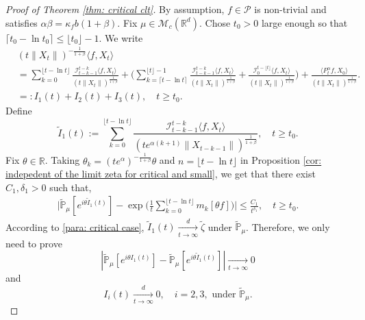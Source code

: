 \documentclass[12pt,a4paper]{amsart}
\theoremstyle{plain}
\theoremstyle{definition}
\numberwithin{equation}{section}
\begin{document}
\begin{proof}[Proof of Theorem \ref{thm: critical clt}]
   By assumption, $f\in\mathcal{P}$ is non-trivial and satisfies $\alpha\beta=\kappa_fb(1+\beta)$.
   Fix $\mu \in \mathcal M_c(\mathbb R^d)$.
    Chose $t_0 > 0$ large enough so that $\lceil t_0-\ln t_0\rceil \leq \lfloor t_0 \rfloor - 1.$
    We write
\begin{align}
    &(t\|X_t\|)^{-\frac{1}{1+\beta}}\langle f,X_t\rangle
    \\ &=\sum_{k=0}^{\lfloor t-\ln t \rfloor} \frac{\mathcal I_{t-k-1}^{t-k}\langle f ,X_t\rangle}{(t\|X_t\|)^{\frac{1}{1+\beta}}}+\Big(\sum_{k=\lceil t-\ln t \rceil}^{\lfloor t \rfloor-1} \frac{\mathcal I_{t-k-1}^{t-k}\langle f ,X_t\rangle}{(t\|X_t\|)^{\frac{1}{1+\beta}}}+\frac{\mathcal I_0^{t-\lfloor t \rfloor}\langle f ,X_t\rangle}{(t\|X_t\|)^{\frac{1}{1+\beta}}}\Big) +
    \frac{\langle P^\alpha_tf,X_0\rangle}{(t\|X_t\|)^{\frac{1}{1+\beta}}}.
    \\&=:I_1(t)+I_2(t) + I_3(t),
    \quad t\geq t_0.
\end{align}
    Define
\[
    \tilde I_1(t)
    :=\sum_{k=0}^{\lfloor t-\ln t \rfloor}\frac{\mathcal I_{t-k-1}^{t-k}\langle f ,X_t\rangle}{(t e^{\alpha(k+1)}\|X_{t-k-1}\|)^{\frac{1}{1+\beta}}},
    \quad t\geq t_0.
\]
Fix $\theta\in \mathbb R$. 
    Taking $\theta_k=(t e^{\alpha})^{-\frac{1}{1+\beta}} \theta $ and $n={\lfloor t-\ln t \rfloor}$ in Proposition \ref{cor: indepedent of the limit zeta for critical and small},
    we get that there exist $C_1,\delta_1>0$ such that,
\begin{align}
    \Big|\mathbb{\tilde{P}}_{\mu} [e^{i\theta\tilde{I}_1(t)}]-\exp\Big(\frac{1}{t}\sum_{k=0}^{\lfloor t-\ln t \rfloor}m_k[\theta f]\Big)\Big|\leq \frac{C_1}{t^{\delta_1}},
    \quad t\geq t_0.
\end{align}
    According to \eqref{para: critical case},  $\tilde{I}_1(t)\xrightarrow[t\to \infty]{d}\tilde \zeta$ under $\tilde {\mathbb P}_\mu$.
    Therefore, we only need to prove
 \begin{equation}\label{toprove-1}
    |\mathbb{\tilde{P}}_{\mu}[e^{i\theta I_1(t)}]-\mathbb{\tilde{P}}_{\mu}[e^{i\theta\tilde{I}_1(t)}]|
    \xrightarrow[t\to \infty]{} 0
 \end{equation}
    and
\begin{equation}\label{toprove-2}
    I_i(t)\xrightarrow[t\to \infty]{d} 0,
    \quad i = 2,3,
    \mbox{ under } \tilde {\mathbb P}_\mu.
\end{equation}



\end{proof}
\end{document}
